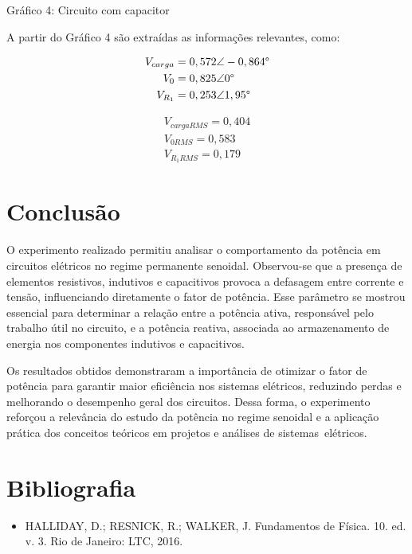 \documentclass[a4 paper]{article}
\newcommand{\parag}{\hspace{30pt}}
\begin{document}
\begin{center}
Gráfico 4: Circuito com capacitor 
\end{center}

A partir do Gráfico 4 são extraídas as informações relevantes, como:


\begin{minipage}{0.4\textwidth}
\begin{align*}
V_{carga}&=0,572\angle-0,864\text{\textdegree}\\
V_0&=0,825\angle0\text{\textdegree}\\
V_{R_1}&=0,253\angle1,95\text{\textdegree}
\end{align*}
\end{minipage}
\begin{minipage}{0.4\textwidth}
\begin{align*}
V_{cargaRMS}=0,404\\
V_{0RMS}=0,583\\
V_{R_1RMS}=0,179
\end{align*}
\end{minipage}

\newpage




\vspace{3cm}\section{Conclusão}
\parag O experimento realizado permitiu analisar o comportamento da potência em circuitos elétricos no regime permanente senoidal. Observou-se que a presença de elementos resistivos, indutivos e capacitivos provoca a defasagem entre corrente e tensão, influenciando diretamente o fator de potência. Esse parâmetro se mostrou essencial para determinar a relação entre a potência ativa, responsável pelo trabalho útil no circuito, e a potência reativa, associada ao armazenamento de energia nos componentes indutivos e capacitivos.

Os resultados obtidos demonstraram a importância de otimizar o fator de potência para garantir maior eficiência nos sistemas elétricos, reduzindo perdas e melhorando o desempenho geral dos circuitos. Dessa forma, o experimento reforçou a relevância do estudo da potência no regime senoidal e a aplicação prática dos conceitos teóricos em projetos e análises de sistemas elétricos.


\section{Bibliografia}

\begin{itemize}
\item HALLIDAY, D.; RESNICK, R.; WALKER, J. Fundamentos de Física. 10. ed. v. 3. Rio de Janeiro: LTC, 2016.
\end{itemize}
\end{document}
